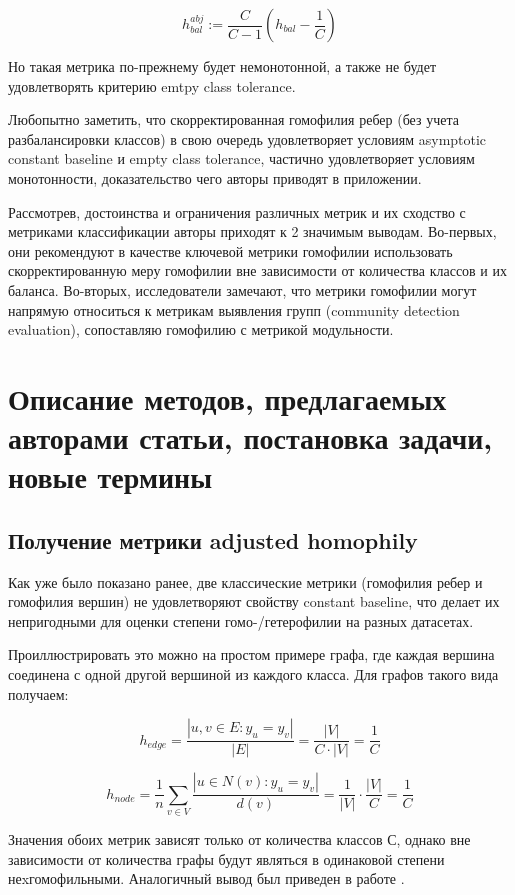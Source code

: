 \documentclass[a4paper,14pt]{article}
\begin{document}
	$$h_{bal}^{abj} := \dfrac{C}{C - 1}\left( h_{bal} - \dfrac{1}{C}\right) $$
	
	Но такая метрика по-прежнему будет немонотонной, а также не будет удовлетворять критерию emtpy class tolerance. 
	
	Любопытно заметить, что скорректированная гомофилия ребер (без учета разбалансировки классов) в свою очередь удовлетворяет условиям asymptotic constant baseline и empty class tolerance, частично удовлетворяет условиям монотонности, доказательство чего авторы приводят в приложении.
	 
	Рассмотрев, достоинства и ограничения различных метрик и их сходство с метриками классификации авторы приходят к 2 значимым выводам.
	Во-первых, они рекомендуют в качестве ключевой метрики гомофилии использовать скорректированную меру гомофилии вне зависимости от количества классов и их баланса.
	Во-вторых, исследователи замечают, что метрики гомофилии могут напрямую относиться к метрикам выявления групп (community detection evaluation), сопоставляю гомофилию с метрикой модульности.
	
	
	\pagebreak
	\section{Описание методов, предлагаемых авторами статьи, постановка задачи, новые термины}
	\setcounter{figure}{0}
	
	\subsection{Получение метрики adjusted homophily}
	
	Как уже было показано ранее, две классические метрики (гомофилия ребер и гомофилия вершин) не удовлетворяют свойству constant baseline, что делает их непригодными для оценки степени гомо-/гетерофилии на разных датасетах.
	
	Проиллюстрировать это можно на простом примере графа, где каждая вершина соединена с одной другой вершиной из каждого класса.
	Для графов такого вида получаем:
	
	$$ h_{edge} = \dfrac{ |{u, v} \in E: y_u = y_v| }{ |E| } = \dfrac{ |V| }{ C \cdot |V| } = \frac{1}{C} $$
	
	$$ h_{node} = \dfrac{1}{n} \sum_{v \in V} \dfrac{|u \in N(v): y_u = y_v|}{ d(v) } = \dfrac{1}{|V|} \cdot \dfrac{|V|}{C} = \dfrac{1}{C} $$
	
	Значения обоих метрик зависят только от количества классов С, однако вне зависимости от количества графы будут являться в одинаковой степени неxгомофильными.
	Аналогичный вывод был приведен в работе \cite{lim2021large}.
	
\end{document}
